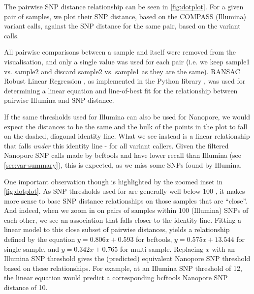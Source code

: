 The pairwise SNP distance relationship can be seen in
\autoref{fig:dotplot}. For a given pair of samples, we
plot their SNP distance, based on the COMPASS (Illumina) variant calls,
against the SNP distance for the same pair, based on the \ont{} variant calls.

All pairwise comparisons between a sample and itself were removed from the visualisation, and only a single value was used for each pair (i.e. we keep sample1 vs. sample2 and discard sample2 vs. sample1 as they are the same). RANSAC Robust Linear Regression \cite{fischler1981}, as implemented in the Python library  \cite{scikitlearn}, was used for determining a linear equation and line-of-best fit for the relationship between pairwise Illumina and \ont{} SNP distance.

 If the same thresholds used for Illumina can
also be used for Nanopore, we would expect the distances to be the same
and the bulk of the points in the plot to fall on the dashed, diagonal
identity line. What we see instead is a linear relationship that falls
\emph{under} this identity line - for all \ont{} variant callers. Given the filtered Nanopore
SNP calls made by bcftools and \pandora{} have lower recall than Illumina (see \autoref{sec:var-summary}), this
is expected, as we miss some SNPs found by Illumina.

One important observation though is highlighted by the zoomed inset in
\autoref{fig:dotplot}. As SNP thresholds used for \mtb{}
are generally well below 100 \cite{stimson2019}, it makes more sense to base SNP distance
relationships on those samples that are ``close''. And indeed, when we
zoom in on pairs of samples within 100 (Illumina) SNPs of each other, we
see an association that falls closer to the identity line. Fitting a
linear model to this close subset of pairwise distances, yields a
relationship defined by the equation $y=0.806x+0.593$ for bcftools, $y=0.575x+13.544$ for \pandora{} single-sample, and $y=0.342x+0.765$ for \pandora{} multi-sample.
Replacing $x$ with an Illumina SNP threshold gives the
(predicted) equivalent Nanopore SNP threshold based on these
relationships. For example, at an Illumina SNP threshold of 12, the
linear equation would predict a corresponding bcftools Nanopore SNP distance of
10.

